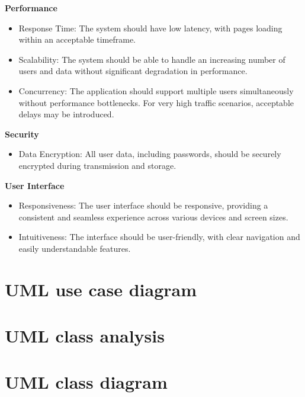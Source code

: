 \textbf{Performance}

\begin{itemize}
    \item Response Time: The system should have low latency, with pages loading within an acceptable timeframe.
    \item Scalability: The system should be able to handle an increasing number of users and data without significant degradation in performance.
    \item Concurrency: The application should support multiple users simultaneously without performance bottlenecks. For very high traffic scenarios, acceptable delays may be introduced.
\end{itemize}

\textbf{Security}

\begin{itemize}
    \item Data Encryption: All user data, including passwords, should be securely encrypted during transmission and storage.
\end{itemize}

\textbf{User Interface}

\begin{itemize}
    \item Responsiveness: The user interface should be responsive, providing a consistent and seamless experience across various devices and screen sizes.
    \item Intuitiveness: The interface should be user-friendly, with clear navigation and easily understandable features.
\end{itemize}

\section{UML use case diagram}


\section{UML class analysis}

\section{UML class diagram}
